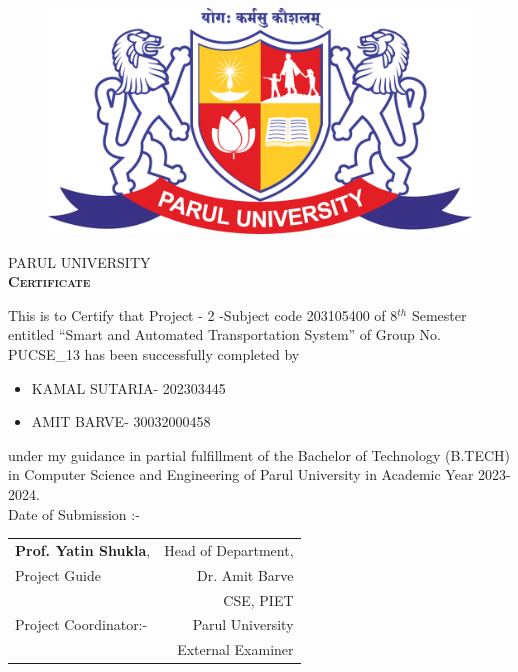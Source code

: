 \thispagestyle{plain}
\begin{figure}
    \centering
    \includegraphics[scale=0.1]{parullogo.png}
    \end{figure}
\vspace{1.5cm}
\begin{center}
    {\Huge \textsc{PARUL UNIVERSITY}}\\
   
    \vspace{1cm}
     {\Huge \bf \textsc{Certificate}}\\
     \vspace{0.5cm}
     \end{center}
     \large{This is to Certify that Project - 2 -Subject code 203105400 of 8$^{th}$ Semester entitled “Smart and Automated Transportation System” of Group No. PUCSE\_13 has been successfully completed by}
     \begin{itemize}
     \centering
         \item KAMAL SUTARIA- 202303445
         \item AMIT BARVE- 30032000458
     \end{itemize}
         
     \noindent
    \large {under my guidance in partial fulfillment of the Bachelor of Technology (B.TECH) in Computer Science and Engineering of Parul University in Academic Year 2023- 2024.}\\      
    Date of Submission :-
   
   \vspace{1.5cm}
   \begin{tabular}{l r}
   
      \textbf{Prof. Yatin Shukla}, & \hspace{4cm} Head of Department,  \\ 
      Project Guide & Dr. Amit Barve \\  &  CSE, PIET\\
      Project Coordinator:-
      & Parul University\\ [7ex]  
      & External Examiner 
   \end{tabular}
   
   